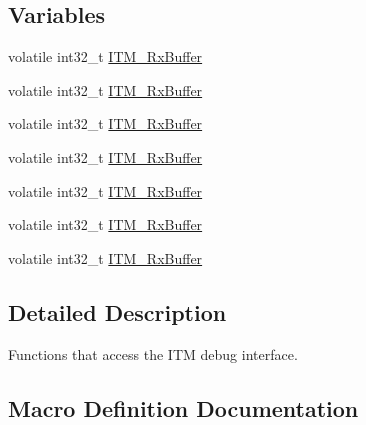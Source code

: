 \subsection*{Variables}
\begin{DoxyCompactItemize}
\item 
volatile int32\+\_\+t \hyperlink{group___c_m_s_i_s__core___debug_functions_ga12e68e55a7badc271b948d6c7230b2a8}{I\+T\+M\+\_\+\+Rx\+Buffer}
\item 
volatile int32\+\_\+t \hyperlink{group___c_m_s_i_s__core___debug_functions_ga12e68e55a7badc271b948d6c7230b2a8}{I\+T\+M\+\_\+\+Rx\+Buffer}
\item 
volatile int32\+\_\+t \hyperlink{group___c_m_s_i_s__core___debug_functions_ga12e68e55a7badc271b948d6c7230b2a8}{I\+T\+M\+\_\+\+Rx\+Buffer}
\item 
volatile int32\+\_\+t \hyperlink{group___c_m_s_i_s__core___debug_functions_ga12e68e55a7badc271b948d6c7230b2a8}{I\+T\+M\+\_\+\+Rx\+Buffer}
\item 
volatile int32\+\_\+t \hyperlink{group___c_m_s_i_s__core___debug_functions_ga12e68e55a7badc271b948d6c7230b2a8}{I\+T\+M\+\_\+\+Rx\+Buffer}
\item 
volatile int32\+\_\+t \hyperlink{group___c_m_s_i_s__core___debug_functions_ga12e68e55a7badc271b948d6c7230b2a8}{I\+T\+M\+\_\+\+Rx\+Buffer}
\item 
volatile int32\+\_\+t \hyperlink{group___c_m_s_i_s__core___debug_functions_ga12e68e55a7badc271b948d6c7230b2a8}{I\+T\+M\+\_\+\+Rx\+Buffer}
\end{DoxyCompactItemize}


\subsection{Detailed Description}
Functions that access the I\+TM debug interface. 



\subsection{Macro Definition Documentation}
\mbox{\label{group___c_m_s_i_s__core___debug_functions_gaa822cb398ee022b59e9e6c5d7bbb228a}} 
